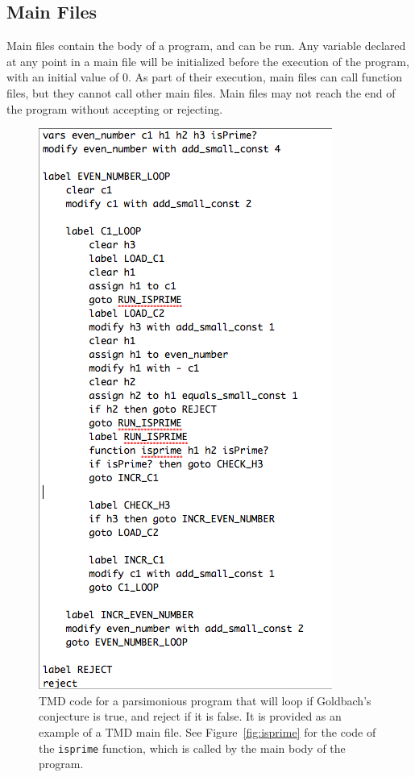 \documentclass[11pt]{report}
\begin{document}
\subsection{Main Files}

Main files contain the body of a program, and can be run. Any variable declared at any point in a main file will be initialized before the execution of the program, with an initial value of 0. As part of their execution, main files can call function files, but they cannot call other main files. Main files may not reach the end of the program without accepting or rejecting. \\

\begin{figure} 
\begin{center} 
\includegraphics[scale=0.75]{figs/goldbach.png} 
\caption{TMD code for a parsimonious program that will loop if Goldbach's conjecture is true, and reject if it is false. It is provided as an example of a TMD main file. See Figure~\ref{fig:isprime} for the code of the \texttt{isprime} function, which is called by the main body of the program.\label{fig:goldbach}} 
\end{center} 
\end{figure}
\end{document}
